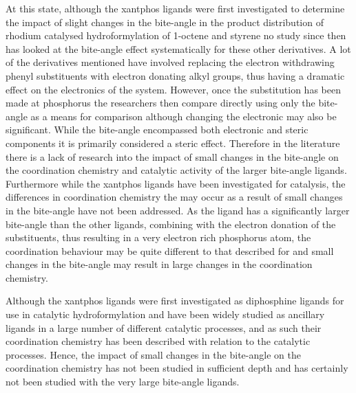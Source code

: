 At this state, although the xantphos ligands were first investigated to determine the impact of slight changes in the bite-angle in the product distribution of rhodium catalysed hydroformylation of 1-octene and styrene no study since then has looked at the bite-angle effect systematically for these other derivatives.  A lot of the derivatives mentioned have involved replacing the electron withdrawing phenyl substituents with electron donating alkyl groups, thus having a dramatic effect on the electronics of the system.  However, once the substitution has been made at phosphorus the researchers then compare directly using only the bite-angle as a means for comparison although changing the electronic may also be significant.  While the bite-angle encompassed both electronic and steric components it is primarily considered a steric effect.  Therefore in the literature there is a lack of research into the impact of small changes in the bite-angle on the coordination chemistry and catalytic activity of the larger bite-angle ligands.  Furthermore while the xantphos ligands have been investigated for catalysis, the differences in coordination chemistry the may occur as a result of small changes in the bite-angle have not been addressed.  As the \tBuxantphos{} ligand has a significantly larger bite-angle than the other ligands, combining with the electron donation of the \tBu{} substituents, thus resulting in a very electron rich phosphorus atom, the coordination behaviour may be quite different to that described for \Phxantphos{} and small changes in the bite-angle may result in large changes in the coordination chemistry.  

Although the xantphos ligands were first investigated as diphosphine ligands for use in catalytic hydroformylation and have been widely studied as ancillary ligands in a large number of different catalytic processes, and as such their coordination chemistry has been described with relation to the catalytic processes.  Hence, the impact of small changes in the bite-angle on the coordination chemistry has not been studied in sufficient depth and has certainly not been studied with the very large bite-angle \tBuxantphos{} ligands.

